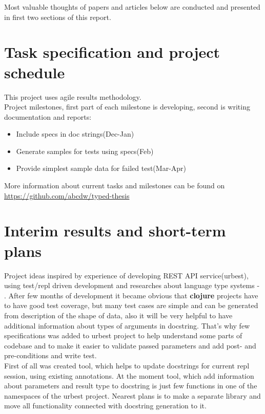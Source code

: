 \documentclass[12pt,a4paper]{report}
\begin{document}
Most valuable thoughts of papers and articles below are conducted and presented in first two
sections of this report.

\section*{Task specification and project schedule}
This project uses agile results methodology. \\

Project milestones, first part of each milestone is developing, second is
writing documentation and reports: \\
\begin{itemize}
\item Include specs in doc strings(Dec-Jan)
\item Generate samples for tests using specs(Feb)
\item Provide simplest sample data for failed test(Mar-Apr)
\end{itemize}

More information about current tasks and milestones can be found on \href{https://github.com/abcdw/typed-thesis/projects/1}{https://github.com/abcdw/typed-thesis}



\section*{Interim results and short-term plans}

Project ideas inspired by experience of developing REST API service(urbest), using
test/repl driven development and researches about language type systems
\cite{coldwar} - \cite{statictypingadv}. After few months of development
it became obvious that \textbf{clojure} projects have to have good test
coverage, but many test cases are simple and can be generated from description
of the shape of data, also it will be very helpful to have additional
information about types of arguments in docstring. That's why few specifications
was added to urbest project to help understand some parts of codebase and to
make it easier to validate passed parameters and add post- and pre-conditions
and write test.\\

First of all was created tool, which helps to update docstrings for
current repl session, using existing annotations. At the moment tool, which add
information about parameters and result type to
docstring is just few functions in one of the namespaces of the urbest project.
Nearest plans is to make a separate library and move all functionality connected
with docstring generation to it.\\
\end{document}
